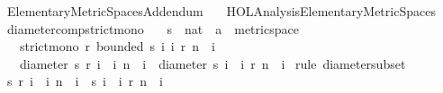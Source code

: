 %
\begin{isabellebody}%
%
%
\isadelimtheory
%
\endisadelimtheory
%
\isatagtheory
{}\isamarkupfalse%
\ Elementary{\isacharunderscore}{\kern0pt}Metric{\isacharunderscore}{\kern0pt}Spaces{\isacharunderscore}{\kern0pt}Addendum\isanewline
\ \ \ {\isachardoublequoteopen}HOL{\isacharminus}{\kern0pt}Analysis{\isachardot}{\kern0pt}Elementary{\isacharunderscore}{\kern0pt}Metric{\isacharunderscore}{\kern0pt}Spaces{\isachardoublequoteclose}\isanewline
{}%
\endisatagtheory
{\isafoldtheory}%
%
\isadelimtheory
\isanewline
%
\endisadelimtheory
\isanewline
{}\isamarkupfalse%
\ diameter{\isacharunderscore}{\kern0pt}comp{\isacharunderscore}{\kern0pt}strict{\isacharunderscore}{\kern0pt}mono{\isacharcolon}{\kern0pt}\isanewline
\ \ \ s\ {\isacharcolon}{\kern0pt}{\isacharcolon}{\kern0pt}\ {\isachardoublequoteopen}nat\ {\isasymRightarrow}\ {\isacharprime}{\kern0pt}a\ {\isacharcolon}{\kern0pt}{\isacharcolon}{\kern0pt}\ metric{\isacharunderscore}{\kern0pt}space{\isachardoublequoteclose}\isanewline
\ \ \ {\isachardoublequoteopen}strict{\isacharunderscore}{\kern0pt}mono\ r{\isachardoublequoteclose}\ {\isachardoublequoteopen}bounded\ {\isacharbraceleft}{\kern0pt}s\ i\ {\isacharbar}{\kern0pt}i{\isachardot}{\kern0pt}\ r\ n\ {\isasymle}\ i{\isacharbraceright}{\kern0pt}{\isachardoublequoteclose}\isanewline
\ \ \ {\isachardoublequoteopen}diameter\ {\isacharbraceleft}{\kern0pt}s\ {\isacharparenleft}{\kern0pt}r\ i{\isacharparenright}{\kern0pt}\ {\isacharbar}{\kern0pt}\ i{\isachardot}{\kern0pt}\ n\ {\isasymle}\ i{\isacharbraceright}{\kern0pt}\ {\isasymle}\ diameter\ {\isacharbraceleft}{\kern0pt}s\ i\ {\isacharbar}{\kern0pt}\ i{\isachardot}{\kern0pt}\ r\ n\ {\isasymle}\ i{\isacharbraceright}{\kern0pt}{\isachardoublequoteclose}\isanewline
%
\isadelimproof
%
\endisadelimproof
%
\isatagproof
{}\isamarkupfalse%
\ {\isacharparenleft}{\kern0pt}rule\ diameter{\isacharunderscore}{\kern0pt}subset{\isacharparenright}{\kern0pt}\isanewline
\ \ \isamarkupfalse%
\ {\isachardoublequoteopen}{\isacharbraceleft}{\kern0pt}s\ {\isacharparenleft}{\kern0pt}r\ i{\isacharparenright}{\kern0pt}\ {\isacharbar}{\kern0pt}\ i{\isachardot}{\kern0pt}\ n\ {\isasymle}\ i{\isacharbraceright}{\kern0pt}\ {\isasymsubseteq}\ {\isacharbraceleft}{\kern0pt}s\ i\ {\isacharbar}{\kern0pt}\ i{\isachardot}{\kern0pt}\ r\ n\ {\isasymle}\ i{\isacharbraceright}{\kern0pt}{\isachardoublequoteclose}\ \isamarkupfalse%

\end{isabellebody}
